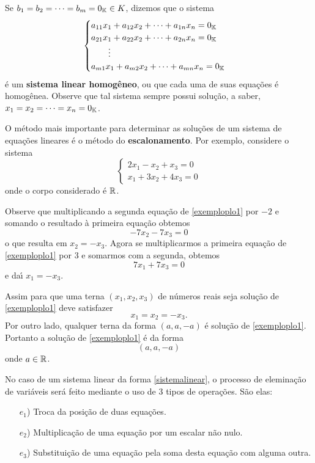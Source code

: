 Se $b_1 = b_2 = \cdots = b_m = 0_{\mathbb{K}} \in K$, dizemos que o sistema
\begin{equation}\label{sistemalinearhomogeneo}\index{Sistema Linear}
	\begin{cases}
		a_{11}x_1 + a_{12}x_2 + \cdots + a_{1n}x_n = 0_\cp{K}\\
		a_{21}x_1 + a_{22}x_2 + \cdots + a_{2n}x_n = 0_\cp{K}\\
		\qquad \vdots\\
		a_{m1}x_1 + a_{m2}x_2 + \cdots + a_{mn}x_n = 0_\cp{K}\\
	\end{cases}
\end{equation}
\'e um \textbf{sistema linear homog\^eneo}, ou que cada uma de suas equa\c{c}\~oes \'e homog\^enea. Observe que tal sistema sempre possui solu\c{c}\~ao, a saber, $x_1 = x_2 = \cdots = x_n = 0_{\mathbb{K}}$.

O m\'etodo mais importante para determinar as solu\c{c}\~oes de um sistema de equa\c{c}\~oes lineares \'e o m\'etodo do \textbf{escalonamento}. Por exemplo, considere o sistema
\begin{equation}\label{exemploplo1}
	\begin{cases}
		2x_1 - x_2 + x_3 = 0\\
		x_1 + 3x_2 + 4x_ 3 = 0
	\end{cases}
\end{equation}
onde o corpo considerado \'e $\mathbb{R}$.

Observe que multiplicando a segunda equa\c{c}\~ao de \eqref{exemploplo1} por $-2$ e somando o resultado \`a primeira equa\c{c}\~ao obtemos
\[
	-7x_2 - 7x_3 = 0
\]
o que resulta em $x_2 = -x_3$. Agora se multiplicarmos a primeira equa\c{c}\~ao de \eqref{exemploplo1} por $3$ e somarmos com a segunda, obtemos
\[
	7x_1 + 7x_3 = 0
\]
e da{\'\i} $x_1 = -x_3$.

Assim para que uma terna $(x_1, x_2, x_3)$ de n\'umeros reais seja solu\c{c}\~ao de \eqref{exemploplo1} deve satisfazer
\[
	x_1 = x_2 = -x_3.
\]
Por outro lado, qualquer terna da forma $(a, a, -a)$ \'e solu\c{c}\~ao de \eqref{exemploplo1}. Portanto a solu\c{c}\~ao de \eqref{exemploplo1} \'e da forma
\[
	(a, a, -a)
\]
onde $a \in \mathbb{R}$.

No caso de um sistema linear da forma \eqref{sistemalinear}, o processo de elemina\c{c}\~ao de vari\'aveis ser\'a feito mediante o uso de 3 tipos de opera\c{c}\~oes. S\~ao elas:
\begin{itemize}
	\item[$e_1$)] Troca da posi\c{c}\~ao de duas equa\c{c}\~oes.
	\item[$e_2$)] Multiplica\c{c}\~ao de uma equa\c{c}\~ao por um escalar n\~ao nulo.
	\item[$e_3$)] Substitui\c{c}\~ao de uma equa\c{c}\~ao pela soma desta equa\c{c}\~ao com alguma outra.
\end{itemize}

